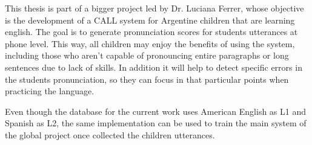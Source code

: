 This thesis is part of a bigger project led by Dr. Luciana Ferrer, whose objective is 
the development of a CALL system for Argentine children that are learning english. The goal
is to generate pronunciation scores for students utterances at phone level. This way,
all children may enjoy the benefits of using the system, including those who aren't capable
of pronouncing entire paragraphs or long sentences due to lack of skills. In addition it will
help to detect specific errors in the students pronunciation, so they can focus in that
particular points when practicing the language.

Even though the database for the current work uses American English as L1 and Spanish as L2,
the same implementation can be used to train the main system of the global project once 
collected the children utterances.